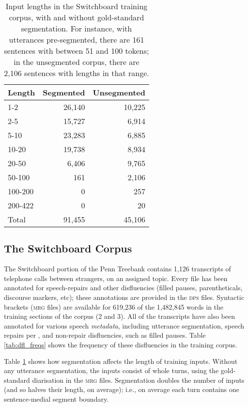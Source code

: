 \documentclass[11pt,letterpaper]{article}
\begin{document}
\begin{table}
\centering
\small
\begin{tabular}{l|rr}
    \hline
    Length & Segmented & Unsegmented \\
    \hline \hline
    1-2 & 26,140 & 10,225 \\
    2-5 & 15,727 & 6,914 \\
    5-10 & 23,283 & 6,885 \\
    10-20 & 19,738 &  8,934 \\
    20-50 & 6,406 & 9,765 \\
    50-100 & 161 & 2,106 \\
    100-200 & 0 & 257 \\
    200-422 & 0 & 20 \\
    \hline
    Total & 91,455 & 45,106 \\
    \hline
\end{tabular}
\caption{\small Input lengths in the Switchboard training corpus, with and without
    gold-standard segmentation.  For instance, with utterances pre-segmented,
    there are 161 sentences with between 51 and 100 tokens; in the unsegmented
corpus, there are 2,106 sentences with lengths in that range.
\label{tab:seg_freqs}}
\end{table}

\newpage
\subsection{The Switchboard Corpus}
\label{sec:swbd}

The Switchboard portion of the Penn Treebank \citep{marcus:93} contains 1,126
transcripts of telephone calls between strangers, on an assigned topic.
Every file has been annotated for speech-repairs and other disfluencies (filled
pauses, parentheticals, discourse markers, etc); these annotations are provided
in the \textsc{dps} files.  Syntactic brackets (\textsc{mrg} files) are available
for 619,236 of the 1,482,845 words in the training sections of the corpus (2 and 3). 
All of the transcripts have also been annotated for various speech \emph{metadata},
including utterance segmentation, speech repairs per \citet{shriberg:94}, and 
non-repair disfluencies, such as filled pauses.  Table \ref{tab:dfl_freqs} shows the
frequency of these disfluencies in the training corpus.

Table \ref{tab:seg_freqs} shows how segmentation affects the length of training
inputs.  Without any utterance segmentation, the inputs consist of whole turns,
using the gold-standard diarisation in the \textsc{mrg} files.
Segmentation doubles the number of inputs (and so halves their length, on average);
i.e., on average each turn contains one sentence-medial segment boundary.
\end{document}
